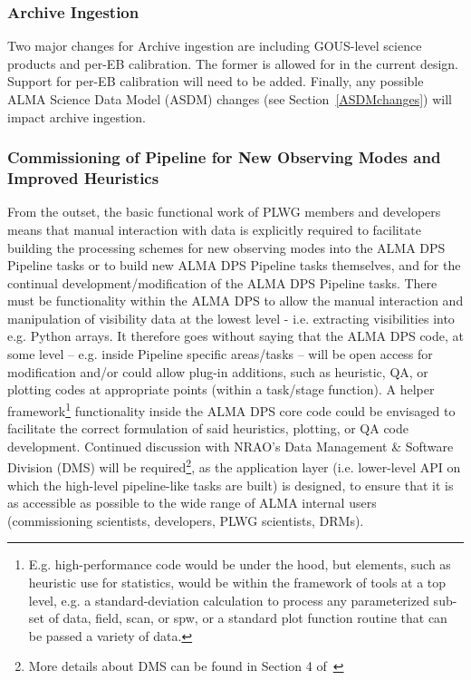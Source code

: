 \subsubsection{Archive Ingestion}
\label{archiveIngestion}

Two major changes for Archive ingestion are including GOUS-level science products and per-EB calibration. The former is allowed for in the current design. Support for per-EB calibration will need to be added. Finally, any possible ALMA Science Data Model (ASDM) changes (see Section~\ref{ASDMchanges}) will impact archive ingestion.

\subsubsection{Commissioning of Pipeline for New Observing Modes and Improved Heuristics}

From the outset, the basic functional work of PLWG members and developers means that manual interaction with data is explicitly required to facilitate building the processing schemes for new observing modes into the ALMA DPS Pipeline tasks or to build new ALMA DPS Pipeline tasks themselves, and for the continual development/modification of the ALMA DPS Pipeline tasks. There must be functionality within the ALMA DPS to allow the manual interaction and manipulation of visibility data at the lowest level - i.e. extracting visibilities into e.g. Python arrays. It therefore goes without saying that the ALMA DPS code, at some level -- e.g. inside Pipeline specific areas/tasks -- will be open access for modification and/or could allow plug-in additions, such as heuristic, QA, or plotting codes at appropriate points (within a task/stage function). A helper framework\footnote{E.g. high-performance code would be under the hood, but elements, such as heuristic use for statistics, would be within the framework of tools at a top level, e.g. a standard-deviation calculation to process any parameterized sub-set of data, field, scan, or spw, or a standard plot function routine that can be passed a variety of data.} functionality inside the ALMA DPS core code could be envisaged to facilitate the correct formulation of said heuristics, plotting, or QA code development. Continued discussion with NRAO's Data Management \& Software Division (DMS) will be required\footnote{More details about DMS can be found in Section 4 of~\cite{dp}}, as the application layer (i.e. lower-level API on which the high-level pipeline-like tasks are built) is designed, to ensure that it is as accessible as possible to the wide range of ALMA internal users (commissioning scientists, developers, PLWG scientists, DRMs).


